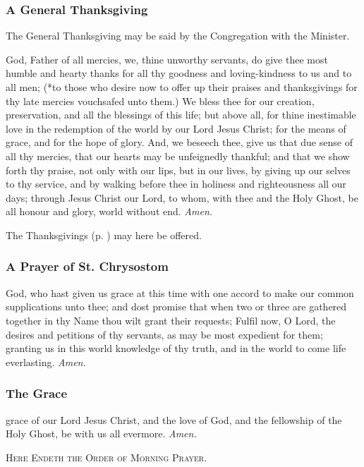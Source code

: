 \subsubsection{A General Thanksgiving}
\begin{rubric}
    The General Thanksgiving may be said by the Congregation with the Minister.
\end{rubric}
 God, Father of all mercies, we, thine unworthy servants, do give thee most humble and hearty thanks for all thy goodness and loving-kindness to us and to all men; (*to those who desire now to offer up their praises and thanksgivings for thy late mercies vouchsafed unto them.) We bless thee for our creation, preservation, and all the blessings of this life; but above all, for thine inestimable love in the redemption of the world by our Lord Jesus Christ; for the means of grace, and for the hope of glory. And, we beseech thee, give us that due sense of all thy mercies, that our hearts may be unfeignedly thankful; and that we show forth thy praise, not only with our lips, but in our lives, by giving up our selves to thy service, and by walking before thee in holiness and righteousness all our days; through Jesus Christ our Lord, to whom, with thee and the Holy Ghost, be all honour and glory, world without end. \textit{Amen.}
\begin{rubric}
    The Thanksgivings (p. \pageref{thanksgiving}) may here be offered.
\end{rubric}

\subsubsection{A Prayer of St. Chrysostom}
 God, who hast given us grace at this time with one accord to make our common supplications unto thee; and dost promise that when two or three are gathered together in thy Name thou wilt grant their requests; Fulfil now, O Lord, the desires and petitions of thy servants, as may be most expedient for them; granting us in this world knowledge of thy truth, and in the world to come life everlasting. \textit{Amen.}
\subsubsection{The Grace}
 grace of our Lord Jesus Christ, {} and the love of God, and the fellowship of the Holy Ghost, be with us all evermore. \textit{Amen.}


\begin{center}
    \textsc{Here Endeth the Order of Morning Prayer.}
\end{center}
